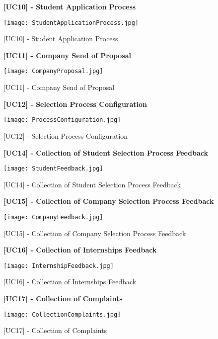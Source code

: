 			
			\begin{figure}[H]
				\centering
				{\bfseries [UC10] - Student Application Process}
				\caption{[UC10] - Student Application Process}
				\texttt{[image: StudentApplicationProcess.jpg]}
				
			\end{figure}
			
			\begin{figure}[H]
				\centering
				{\bfseries [UC11] - Company Send of Proposal}
				\caption{[UC11] - Company Send of Proposal}
				\texttt{[image: CompanyProposal.jpg]}
				
			\end{figure}
			
			\begin{figure}[H]
				\centering
				{\bfseries [UC12] - Selection Process Configuration}
				\caption{[UC12] - Selection Process Configuration}
				\texttt{[image: ProcessConfiguration.jpg]}
				
			\end{figure}
			
			\begin{figure}[H]
				\centering
				{\bfseries [UC14] - Collection of Student Selection Process Feedback}
				\caption{[UC14] - Collection of Student Selection Process Feedback}
				\texttt{[image: StudentFeedback.jpg]}
				
			\end{figure}
			
			\begin{figure}[H]
				\centering
				{\bfseries [UC15] - Collection of Company Selection Process Feedback}
				\caption{[UC15] - Collection of Company Selection Process Feedback}
				\texttt{[image: CompanyFeedback.jpg]}
				
			\end{figure}
			
			\begin{figure}[H]
				\centering
				{\bfseries [UC16] - Collection of Internships Feedback}
				\caption{[UC16] - Collection of Internships Feedback}
				\texttt{[image: InternshipFeedback.jpg]}
				
			\end{figure}
			
			
			\begin{figure}[H]
				\centering
				{\bfseries [UC17] - Collection of Complaints}
				\caption{[UC17] - Collection of Complaints}
				\texttt{[image: CollectionComplaints.jpg]}
				
			\end{figure}
			
